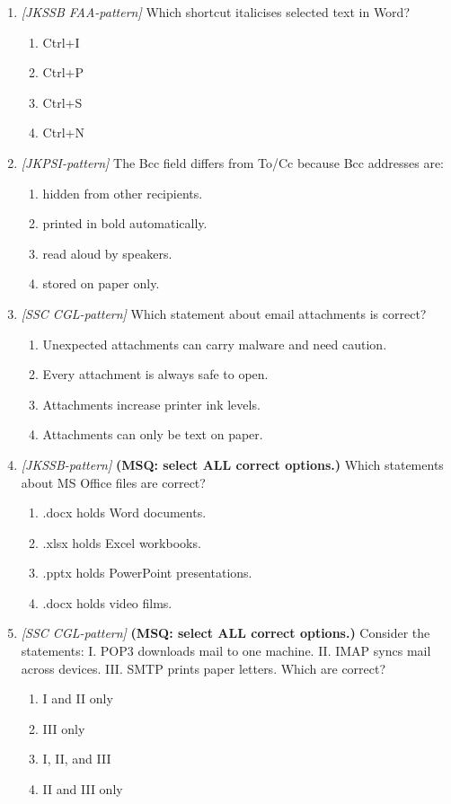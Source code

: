 \documentclass[11pt]{article}
\begin{document}
\begin{enumerate}[label=\textbf{Q\arabic*.}, leftmargin=*]
\item \textit{[JKSSB FAA-pattern]} Which shortcut italicises selected text in Word?
  \begin{enumerate}[label=\Alph*.]
    \item Ctrl+I
    \item Ctrl+P
    \item Ctrl+S
    \item Ctrl+N
  \end{enumerate}
\item \textit{[JKPSI-pattern]} The Bcc field differs from To/Cc because Bcc addresses are:
  \begin{enumerate}[label=\Alph*.]
    \item hidden from other recipients.
    \item printed in bold automatically.
    \item read aloud by speakers.
    \item stored on paper only.
  \end{enumerate}
\item \textit{[SSC CGL-pattern]} Which statement about email attachments is correct?
  \begin{enumerate}[label=\Alph*.]
    \item Unexpected attachments can carry malware and need caution.
    \item Every attachment is always safe to open.
    \item Attachments increase printer ink levels.
    \item Attachments can only be text on paper.
  \end{enumerate}
\item \textit{[JKSSB-pattern]} \textbf{(MSQ: select ALL correct options.)} Which statements about MS Office files are correct?
  \begin{enumerate}[label=\Alph*.]
    \item .docx holds Word documents.
    \item .xlsx holds Excel workbooks.
    \item .pptx holds PowerPoint presentations.
    \item .docx holds video films.
  \end{enumerate}
\item \textit{[SSC CGL-pattern]} \textbf{(MSQ: select ALL correct options.)} Consider the statements: I. POP3 downloads mail to one machine. II. IMAP syncs mail across devices. III. SMTP prints paper letters. Which are correct?
  \begin{enumerate}[label=\Alph*.]
    \item I and II only
    \item III only
    \item I, II, and III
    \item II and III only
  \end{enumerate}
\end{enumerate}
\def\JKSSBLessonID{61}\def\JKSSBAnswers{0}
\end{document}
